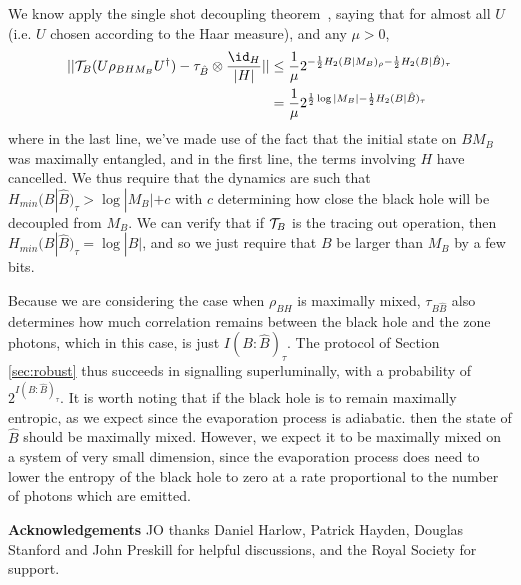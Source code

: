 \documentclass[11pt,a4paper]{article}
\begin{document}
We know apply the single shot decoupling theorem~\cite{dupuis2010one}, saying that for almost all $U$ (i.e. $U$ chosen according to the Haar measure), and any $\mu>0$,
\begin{align}
||{\cal T}_B(U\rho_{BHM_B}U^\dagger)-\tau_{{\hat B}}\otimes\frac{\id_H}{|H|}||
&\leq
\frac{1}{\mu} 2^{
-\frac{1}{2}H_2(B|M_B)_\rho-\frac{1}{2}H_{2}(B|{\hat B})_\tau
}\\
&=
\frac{1}{\mu} 2^{\frac{1}{2}\log|M_B|
- \frac{1}{2}H_{2}(B|{\hat B})_\tau
}
\end{align}
where in the last line, we've made use of the fact that the initial state on $BM_B$ was maximally entangled, and in the first line, the terms involving $H$ have cancelled.
We thus require that the dynamics are such that $H_{min}(B|{\hat B})_\tau>\log|M_B|+c$ with $c$ determining how close the black hole will be decoupled from $M_B$.
We can verify that if  ${\cal T}_B$ is the tracing out operation, then $H_{min}(B|{\hat B})_\tau=\log|B|$, and so we just require that $B$ be larger than $M_B$ by a few bits.

 Because we are considering the case when $\rho_{BH}$ is maximally mixed, $\tau_{B{\hat B}}$ also determines how much correlation remains between the black hole and the zone photons, which in this case, is just $I(B:{\hat B})_\tau$. The protocol
 of Section \ref{sec:robust} thus succeeds in signalling superluminally, with a probability of $2^{I(B:{\hat B})_\tau}$. It is worth noting that if the black hole is to remain
 maximally entropic, as we expect since the evaporation process is adiabatic. then the state of $\hat B$ should be maximally mixed.  However, we expect it to be maximally
 mixed on a system of very small dimension, since the evaporation process does need to lower the entropy of the black hole to zero at a rate proportional to the number of photons
 which are emitted.



\setcounter{secnumdepth}{3} 
{\bf Acknowledgements} 
JO thanks Daniel Harlow, Patrick Hayden, Douglas Stanford and John Preskill for helpful discussions, and the Royal Society for support.

%

\end{document}
